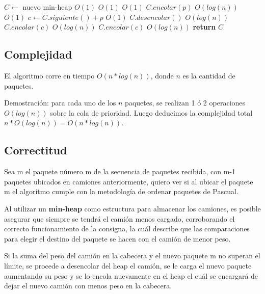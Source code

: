 \documentclass[a4paper,10pt,twoside]{article}
\newenvironment{pseudo}[1][]{%
    \vspace{0.5em}%
    \begin{algorithmic}%
}
{%
    \end{algorithmic}%
    \vspace{0.5em}%
}
\newcommand{\In}{\textbf{in} }
\newcommand{\Ode}[1]{\hfill $O(#1)$}
\begin{document}
\begin{pseudo}
        \State $C \leftarrow$ nuevo min-heap                    \Ode{1}
        \ForAll{$p$ \In $\langle p_1, \ldots, p_n \rangle$}     \Ode{1}
                                     \Ode{1}
                \State $C.encolar(p)$                           \Ode{log(n)}
                              \Ode{1}
                \State $c \leftarrow C.siguiente() + p$         \Ode{1}
                \State $C.desencolar()$                         \Ode{log(n)}
                \State $C.encolar(c)$                           \Ode{log(n)}
            \Else
                \State $C.encolar(c)$                           \Ode{log(n)}
            \EndIf
        \EndFor
        \State \textbf{return} $C$
    \EndProcedure
\end{pseudo}


\subsection{Complejidad}

El algoritmo corre en tiempo $O(n*log(n))$, donde $n$ es la cantidad de paquetes.

Demostración: para cada uno de los $n$ paquetes, se realizan 1 ó 2 operaciones $O(log(n))$ sobre la cola de prioridad. Luego deducimos la complejidad total $n * O(log(n)) = O(n * log(n))$.

\subsection{Correctitud}
Sea m el paquete número m de la secuencia de paquetes recibida, con m-1 paquetes ubicados en camiones anteriormente, quiero ver si al ubicar el paquete m el algoritmo cumple con la metodología de ordenar paquetes de Pascual.

Al utilizar un \textbf{min-heap} como estructura para almacenar los camiones, es posible asegurar que siempre se tendrá el camión menos cargado, corroborando el correcto funcionamiento de la consigna, la cuál describe que las comparaciones para elegir el destino del paquete se hacen con el camión de menor peso. 

Si la suma del peso del camión en la cabecera y el nuevo paquete m no superan el límite, se procede a desencolar del heap el camión, se le carga el nuevo paquete aumentando su peso y se lo encola nuevamente en el heap el cuál se encargará de dejar el nuevo camión con menos peso en la cabecera.
\end{document}
